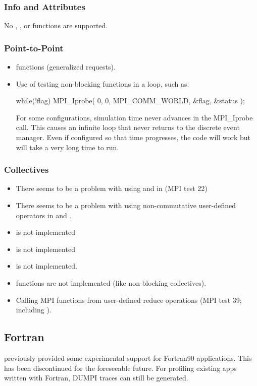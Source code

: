 \subsubsection{Info and Attributes}
\label{subsubsec:issues:mpi:info}

No , , or  functions are supported.

\subsubsection{Point-to-Point}
\label{subsubsec:issues:mpi:ptpt}

\begin{itemize}
\item {} functions (generalized requests).
\item Use of testing non-blocking functions in a loop, such as:


\begin{CppCode}
while(!flag)
{
  MPI_Iprobe( 0, 0, MPI_COMM_WORLD, &flag, &status );
}
\end{CppCode}

For some configurations, simulation time never advances in the MPI\_Iprobe call. 
This causes an infinite loop that never returns to the discrete event manager. 
Even if configured so that time progresses, the code will work but will take a very long time to run.
	
\end{itemize}


\subsubsection{Collectives}
\label{subsubsec:issues:mpi:collectives}

\begin{itemize}
\item There seems to be a problem with using  and  in  (MPI test 22)
\item There seems to be a problem with using non-commutative user-defined operators in  and .
\item {} is not implemented
\item {} is not implemented
\item {} is not implemented.
\item {} functions are not implemented  (like non-blocking collectives).
\item Calling MPI functions from user-defined reduce operations (MPI test 39; including ).
\end{itemize}


\subsection{Fortran}
\label{subsec:issues:fortran}

\sstmacro previously provided some experimental support for Fortran90 applications. 
This has been discontinued for the foreseeable future.
For profiling existing apps written with Fortran, DUMPI traces can still be generated. 

